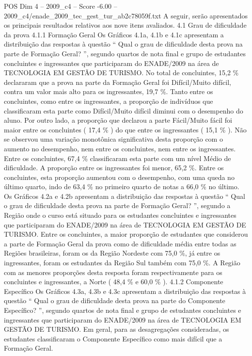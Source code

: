 \begin{textsample}{POS Dim 4 – 2009\_c4 – Score -6.00 – 2009\_c4/enade\_2009\_tec\_gest\_tur\_ab2c78059f.txt}
A seguir, serão apresentados os principais resultados relativos aos nove itens avaliados. 4.1 Grau de dificuldade da prova 4.1.1 Formação Geral Os Gráficos 4.1a, 4.1b e 4.1c apresentam a distribuição das respostas à questão “ Qual o grau de dificuldade desta prova na parte de Formação Geral? ”, segundo quartos de nota final e grupo de estudantes concluintes e ingressantes que participaram do ENADE/2009 na área de TECNOLOGIA EM GESTÃO DE TURISMO.
No total de concluintes, 15,2 \% declararam que a prova na parte da Formação Geral foi Difícil/Muito difícil, contra um valor mais alto para os ingressantes, 19,7 \%.
Tanto entre os concluintes, como entre os ingressantes, a proporção de indivíduos que classificaram esta parte como Difícil/Muito difícil diminui com o desempenho do aluno.
Por outro lado, a proporção que declarou a parte Fácil/Muito fácil foi maior entre os concluintes ( 17,4 \% ) do que entre os ingressantes ( 15,1 \% ).
Não se observou uma variação monotônica significativa desta proporção com o aumento no desempenho, nem entre os concluintes, nem entre os ingressantes.
Entre os concluintes, 67,4 \% classificaram esta parte com um nível Médio de dificuldade.
A proporção entre os ingressantes foi menor, 65,2 \%.
Entre os concluintes, esta proporção aumentou com o desempenho, com uma queda no último quarto, indo de 63,4 \% no primeiro quarto de notas a 66,0 \% no último.
Os Gráficos 4.2a e 4.2b apresentam a distribuição das respostas à questão “ Qual o grau de dificuldade desta prova na parte de Formação Geral? ”, segundo a Região onde o curso está situado para os estudantes concluintes e ingressantes que participaram do ENADE/2009 na área de TECNOLOGIA EM GESTÃO DE TURISMO.
Entre os concluintes, a maior proporção de estudantes que considerou a parte de Formação Geral da prova como de dificuldade média entre todas as Regiões brasileiras, foram os da Região Nordeste com 75,0 \%, já entre os ingressantes, foram os estudantes da Região Sul também com 75,0 \%.
A Região com as menores proporções desta resposta foram respectivamente para os concluintes e ingressantes, a Norte ( 48,4 \% e 60,0 \% ). 4.1.2 Componente Específico Os Gráficos 4.3a, 4.3b e 4.3c apresentam a distribuição das respostas à questão “ Qual o grau de dificuldade desta prova na parte do Componente Específico? ”, segundo quartos de nota final e grupo de estudantes concluintes e ingressantes que participaram do ENADE/2009 na área de TECNOLOGIA EM GESTÃO DE TURISMO.
Em geral, para as desagregações consideradas, os estudantes classificaram o Componente Específico como mais difícil que a Formação Geral.

\end{textsample}
